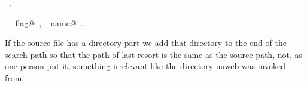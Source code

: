 \documentclass[a4paper]{report}
\begin{document}
\begin{flushleft}
\begin{minipage}{\linewidth}
\begin{list}{}{}
\mbox{}\verb@    *dot = '.';@\\
\mbox{}\verb@  }@\\
\mbox{}\verb@  else {@\\
\mbox{}\verb@    sprintf(tex_name, "%s%s%s.tex", dirpath, path_sep, trim);@\\
\mbox{}\verb@    sprintf(aux_name, "%s%s%s.aux", dirpath, path_sep, trim);@\\
\mbox{}\verb@    *q++ = '.';@\\
\mbox{}\verb@    *q++ = 'w';@\\
\mbox{}\verb@    *q = '\0';@\\
\mbox{}\verb@  }@\\
\mbox{}\verb@}@{\NWsep}
\end{list}
\vspace{-1.5ex}
\footnotesize
\begin{list}{}{\setlength{\itemsep}{-\parsep}\setlength{\itemindent}{-\leftmargin}}
\item \NWtxtMacroRefIn\ .
\item \NWtxtIdentsUsed\nobreak\  \verb@html_flag@\nobreak\ , \verb@source_name@\nobreak\ .
\item{}
\end{list}
\end{minipage}\vspace{4ex}
\end{flushleft}
If the source file has a directory part we add that directory to the
end of the search path so that the path of last resort is the same as
the source path, not, as one person put it, something irrelevant like
the directory nuweb was invoked from.
\end{document}
